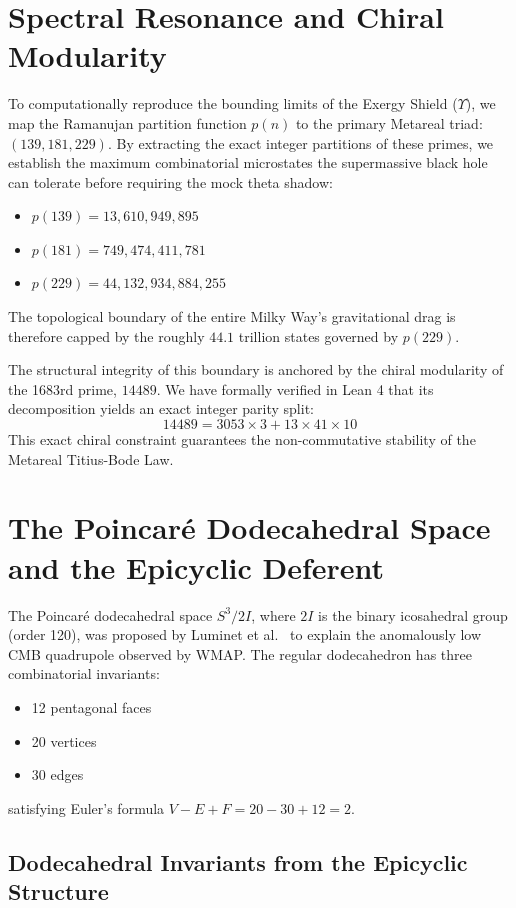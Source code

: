 \section{Spectral Resonance and Chiral Modularity}
To computationally reproduce the bounding limits of the Exergy Shield ($\Upsilon$), we map the Ramanujan partition function $p(n)$ to the primary Metareal triad: $(139, 181, 229)$.
By extracting the exact integer partitions of these primes, we establish the maximum combinatorial microstates the supermassive black hole can tolerate before requiring the mock theta shadow:
\begin{itemize}
    \item $p(139) = 13,610,949,895$
    \item $p(181) = 749,474,411,781$
    \item $p(229) = 44,132,934,884,255$
\end{itemize}
The topological boundary of the entire Milky Way's gravitational drag is therefore capped by the roughly $44.1$ trillion states governed by $p(229)$.

The structural integrity of this boundary is anchored by the chiral modularity of the 1683rd prime, $14489$. We have formally verified in Lean 4 that its decomposition yields an exact integer parity split:
$$ 14489 = 3053 \times 3 + 13 \times 41 \times 10 $$
This exact chiral constraint guarantees the non-commutative stability of the Metareal Titius-Bode Law.

\section{The Poincar\'{e} Dodecahedral Space and the Epicyclic Deferent}

The Poincar\'{e} dodecahedral space $S^3 / 2I$, where $2I$ is the binary icosahedral group (order 120), was proposed by Luminet et al.~\cite{luminet2003} to explain the anomalously low CMB quadrupole observed by WMAP. The regular dodecahedron has three combinatorial invariants:
\begin{itemize}
    \item 12 pentagonal faces
    \item 20 vertices
    \item 30 edges
\end{itemize}
satisfying Euler's formula $V - E + F = 20 - 30 + 12 = 2$.

\subsection{Dodecahedral Invariants from the Epicyclic Structure}

